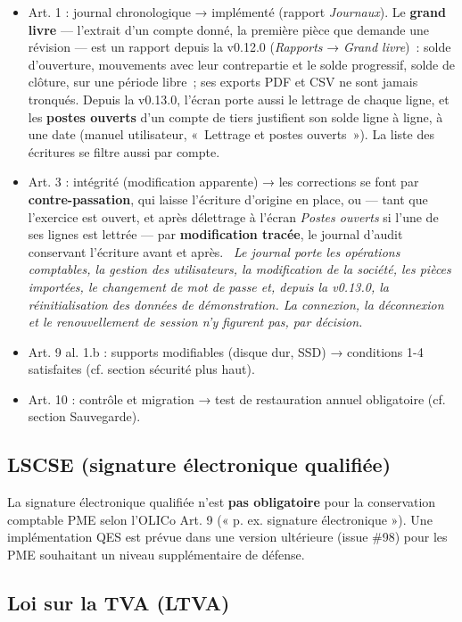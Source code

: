 \documentclass[a4paper,11pt,oneside]{article}
\begin{document}
\begin{itemize}
    \item Art. 1 : journal chronologique → implémenté (rapport \emph{Journaux}). Le \textbf{grand livre} --- l'extrait d'un compte donné, la première pièce que demande une révision --- est un rapport depuis la v0.12.0 (\emph{Rapports} → \emph{Grand livre})~: solde d'ouverture, mouvements avec leur contrepartie et le solde progressif, solde de clôture, sur une période libre~; ses exports PDF et CSV ne sont jamais tronqués. Depuis la v0.13.0, l'écran porte aussi le lettrage de chaque ligne, et les \textbf{postes ouverts} d'un compte de tiers justifient son solde ligne à ligne, à une date (manuel utilisateur, «~Lettrage et postes ouverts~»). La liste des écritures se filtre aussi par compte.
    \item Art. 3 : intégrité (modification apparente) → les corrections se font par \textbf{contre-passation}, qui laisse l'écriture d'origine en place, ou --- tant que l'exercice est ouvert, et après délettrage à l'écran \emph{Postes ouverts} si l'une de ses lignes est lettrée --- par \textbf{modification tracée}, le journal d'audit conservant l'écriture avant et après. \keshAttention\ \emph{Le journal porte les opérations comptables, la gestion des utilisateurs, la modification de la société, les pièces importées, le changement de mot de passe et, depuis la v0.13.0, la réinitialisation des données de démonstration. La connexion, la déconnexion et le renouvellement de session n'y figurent pas, par décision.}
    \item Art. 9 al. 1.b : supports modifiables (disque dur, SSD) → conditions 1-4 satisfaites (cf. section sécurité plus haut).
    \item Art. 10 : contrôle et migration → test de restauration annuel obligatoire (cf. section Sauvegarde).
\end{itemize}

\subsection{LSCSE (signature électronique qualifiée)}

La signature électronique qualifiée n'est \textbf{pas obligatoire} pour la conservation comptable PME selon l'OLICo Art. 9 (« p. ex. signature électronique »). Une implémentation QES est prévue dans une version ultérieure (issue \#98) pour les PME souhaitant un niveau supplémentaire de défense.

\subsection{Loi sur la TVA (LTVA)}
\end{document}
